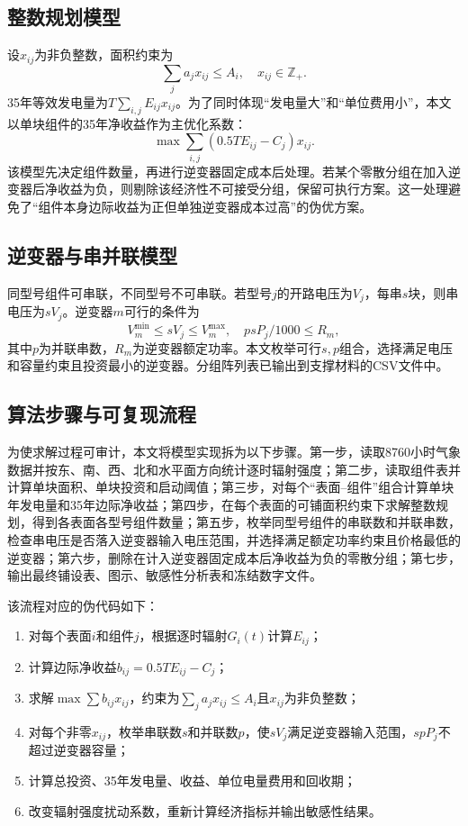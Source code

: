 \documentclass[UTF8,a4paper,12pt]{ctexart}
\begin{document}
\subsection{整数规划模型}
设$x_{ij}$为非负整数，面积约束为
\begin{equation}
\sum_j a_j x_{ij}\le A_i,\quad x_{ij}\in \mathbb{Z}_+.
\end{equation}
35年等效发电量为$T\sum_{i,j}E_{ij}x_{ij}$。为了同时体现“发电量大”和“单位费用小”，本文以单块组件的35年净收益作为主优化系数：
\begin{equation}
\max \sum_{i,j} \left(0.5TE_{ij}-C_j\right)x_{ij}.
\end{equation}
该模型先决定组件数量，再进行逆变器固定成本后处理。若某个零散分组在加入逆变器后净收益为负，则剔除该经济性不可接受分组，保留可执行方案。这一处理避免了“组件本身边际收益为正但单独逆变器成本过高”的伪优方案。

\subsection{逆变器与串并联模型}
同型号组件可串联，不同型号不可串联。若型号$j$的开路电压为$V_j$，每串$s$块，则串电压为$sV_j$。逆变器$m$可行的条件为
\begin{equation}
V_m^{\min}\le sV_j\le V_m^{\max},\quad p s P_j/1000\le R_m,
\end{equation}
其中$p$为并联串数，$R_m$为逆变器额定功率。本文枚举可行$s,p$组合，选择满足电压和容量约束且投资最小的逆变器。分组阵列表已输出到支撑材料的CSV文件中。


\subsection{算法步骤与可复现流程}
为使求解过程可审计，本文将模型实现拆为以下步骤。第一步，读取8760小时气象数据并按东、南、西、北和水平面方向统计逐时辐射强度；第二步，读取组件表并计算单块面积、单块投资和启动阈值；第三步，对每个“表面--组件”组合计算单块年发电量和35年边际净收益；第四步，在每个表面的可铺面积约束下求解整数规划，得到各表面各型号组件数量；第五步，枚举同型号组件的串联数和并联串数，检查串电压是否落入逆变器输入电压范围，并选择满足额定功率约束且价格最低的逆变器；第六步，删除在计入逆变器固定成本后净收益为负的零散分组；第七步，输出最终铺设表、图示、敏感性分析表和冻结数字文件。

该流程对应的伪代码如下：
\begin{enumerate}[leftmargin=2em]
\item 对每个表面$i$和组件$j$，根据逐时辐射$G_i(t)$计算$E_{ij}$；
\item 计算边际净收益$b_{ij}=0.5TE_{ij}-C_j$；
\item 求解$\max\sum b_{ij}x_{ij}$，约束为$\sum_j a_jx_{ij}\le A_i$且$x_{ij}$为非负整数；
\item 对每个非零$x_{ij}$，枚举串联数$s$和并联数$p$，使$sV_j$满足逆变器输入范围，$spP_j$不超过逆变器容量；
\item 计算总投资、35年发电量、收益、单位电量费用和回收期；
\item 改变辐射强度扰动系数，重新计算经济指标并输出敏感性结果。
\end{enumerate}
\end{document}
